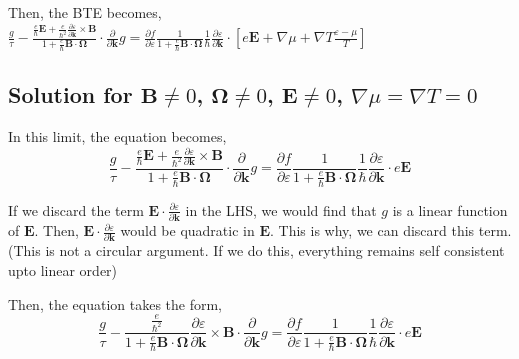 \documentclass{revtex4-2}
\newcommand{\bvec}[1]{{\mathbf #1}}
\begin{document}
Then, the BTE becomes,
$\frac{g}{\tau} -\frac{\frac{e}{\hbar} \bvec{E} +\frac{e}{\hbar^2} \frac{\partial \varepsilon}{\partial \bvec{k}} \times \bvec{B}}{1 + \frac{e}{\hbar} \bvec{B}\cdot\bvec{\Omega}} \cdot\frac{\partial}{\partial \bvec{k}} g = \frac{\partial f}{\partial \varepsilon}\frac{1}{1 + \frac{e}{\hbar} \bvec{B}\cdot\bvec{\Omega}}
\frac{1}{\hbar} \frac{\partial \varepsilon}{\partial \bvec{k}}\cdot\left[e \bvec{E} + \nabla{\mu} + \nabla T \frac{\varepsilon - \mu}{T}\right] $


\subsection{Solution for $\bvec{B}\neq0$, $\bvec{\Omega}\neq 0$, $\bvec{E} \neq 0$, $\nabla \mu = \nabla T = 0$}

In this limit, the equation becomes,
$$
\frac{g}{\tau} -\frac{\frac{e}{\hbar} \bvec{E} +\frac{e}{\hbar^2} \frac{\partial \varepsilon}{\partial \bvec{k}} \times \bvec{B}}{1 + \frac{e}{\hbar} \bvec{B}\cdot\bvec{\Omega}} \cdot\frac{\partial}{\partial \bvec{k}} g = \frac{\partial f}{\partial \varepsilon}\frac{1}{1 + \frac{e}{\hbar} \bvec{B}\cdot\bvec{\Omega}}
\frac{1}{\hbar} \frac{\partial \varepsilon}{\partial \bvec{k}}\cdot e \bvec{E} $$

If we discard the term $\bvec{E} \cdot \frac{\partial \varepsilon}{\partial \bvec{k}}$ in the LHS, we would find that $g$ is a linear function of $\bvec{E}$. Then, $\bvec{E} \cdot \frac{\partial \varepsilon}{\partial \bvec{k}}$ would be quadratic in $\bvec{E}$. This is why, we can discard this term. (This is not a circular argument. If we do this, everything remains self consistent upto linear order)

Then, the equation takes the form,
\begin{equation}
\frac{g}{\tau} -\frac{\frac{e}{\hbar^2} }{1 + \frac{e}{\hbar} \bvec{B}\cdot\bvec{\Omega}} \frac{\partial \varepsilon}{\partial \bvec{k}} \times \bvec{B} \cdot\frac{\partial}{\partial \bvec{k}} g = \frac{\partial f}{\partial \varepsilon}\frac{1}{1 + \frac{e}{\hbar} \bvec{B}\cdot\bvec{\Omega}}
\frac{1}{\hbar} \frac{\partial \varepsilon}{\partial \bvec{k}}\cdot e \bvec{E}
\end{equation}~\label{Eq:BTE_zero_chem_pot_thermal_gradient}
\end{document}
